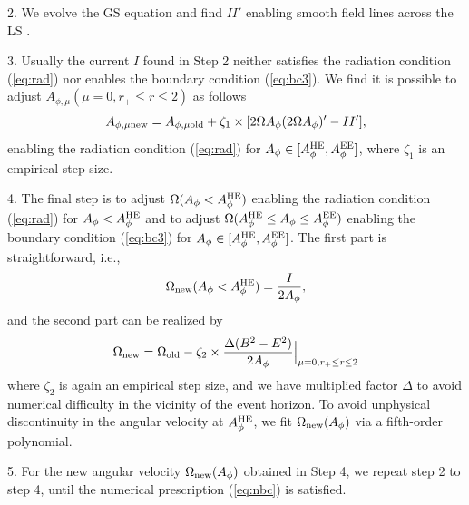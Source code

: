\documentclass[aps,prd,reprint,nofootinbib, superscriptaddress]{revtex4-1}
\def\Ap{A_\phi}
\def\Am{A_{\phi,\mu}}
\def\be{\begin{equation}}
\def\ee{\end{equation}}
\def\AHE{A_\phi^{\rm HE}}
\def\AEE{A_\phi^{\rm EE}}
\begin{document}
2. We evolve the GS equation and find $II'$ enabling smooth field lines across the LS
\cite[see][for details]{Contopoulos2013, Nathanail2014, Pan2016a}.

3. Usually the current $I$ found in Step 2 neither satisfies the radiation condition (\ref{eq:rad})
nor enables the boundary condition (\ref{eq:bc3}). We find it is possible to adjust
$\Am(\mu = 0, r_+ \leq r\leq 2)$ as follows
\be
 A_{\phi,\mu\rm new}  = A_{\phi,\mu \rm old} + \zeta_1\times[2\Omega\Ap(2\Omega\Ap)' -II'],
\ee
enabling the radiation condition (\ref{eq:rad}) for
$A_\phi\in [A_\phi^{\rm HE}, A_\phi^{\rm EE}]$, where $\zeta_1$ is an
empirical step size.

4. The final step is to adjust  $\Omega(\Ap < \AHE)$ enabling  the radiation condition (\ref{eq:rad})
 for $A_\phi < A_\phi^{\rm HE}$ and  to adjust $\Omega(\AHE \leq \Ap \leq \AEE)$
 enabling the boundary condition (\ref{eq:bc3}) for $\Ap \in [\AHE, \AEE]$.
 The first part is straightforward, i.e.,
 \be
\Omega_{\rm new}(\Ap < \AHE) = \frac{I}{2\Ap},
 \ee
 and the second part can be realized by
 \be
\Omega_{\rm new}  = \Omega_{\rm old} - \zeta_2\times\frac{\Delta (B^2-E^2)}{2\Ap}\Big|_{\mu=0, r_+\leq r \leq 2}
 \ee
 where $\zeta_2$ is again an empirical step size, and we have multiplied factor $\Delta$
 to avoid numerical difficulty in the vicinity of the event horizon. To avoid unphysical discontinuity in the angular
 velocity at $\AHE$, we fit $\Omega_{\rm new}(\Ap)$ via a fifth-order polynomial.

 5. For the new angular velocity $\Omega_{\rm new}(\Ap)$ obtained in Step 4, we repeat step 2 to step 4,
 until the numerical prescription (\ref{eq:nbc}) is satisfied.
\end{document}
